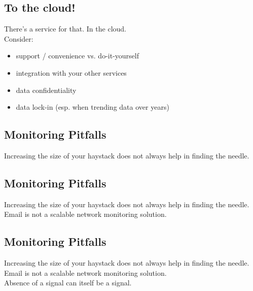 \documentclass[xga]{xdvislides}
\begin{document}
\subsection{To the cloud!}
There’s a service for that. In the cloud. \\

Consider:
\begin{itemize}
	\item support / convenience vs. do-it-yourself
	\item integration with your other services
	\item data confidentiality
	\item data lock-in (esp. when trending data over years)
\end{itemize}

\subsection{Monitoring Pitfalls}
\vspace*{\fill}
\Huge
\begin{center}
Increasing the size of your haystack does not always
help in finding the needle.
\end{center}
\Normalsize
\vspace*{\fill}

\subsection{Monitoring Pitfalls}
\vspace*{\fill}
\Huge
\begin{center}
Increasing the size of your haystack does not always
help in finding the needle. \\
\vspace{.2in}
Email is not a scalable network monitoring solution.
\end{center}
\Normalsize
\vspace*{\fill}

\subsection{Monitoring Pitfalls}
\vspace*{\fill}
\Huge
\begin{center}
Increasing the size of your haystack does not always
help in finding the needle. \\
\vspace{.2in}
Email is not a scalable network monitoring solution. \\
\vspace{.2in}
Absence of a signal can itself be a signal.
\end{center}
\Normalsize
\vspace*{\fill}
\end{document}
